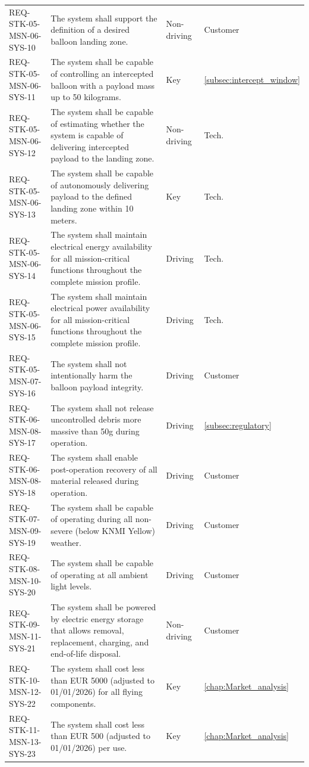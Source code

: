 \begin{xltabular}{\textwidth}{p{0.16\textwidth} p{0.5\textwidth} X p{0.1\textwidth}}
REQ-STK-05-MSN-06-SYS-10 & The system shall support the definition of a desired balloon landing zone. & Non-driving &  Customer\\ 
REQ-STK-05-MSN-06-SYS-11 & The system shall be capable of controlling an intercepted balloon with a payload mass up to 50 kilograms. & Key &  \ref{subsec:intercept_window}\\ 
REQ-STK-05-MSN-06-SYS-12 & The system shall be capable of estimating whether the system is capable of delivering intercepted payload to the landing zone. & Non-driving &  Tech.\\ 
REQ-STK-05-MSN-06-SYS-13 & The system shall be capable of autonomously delivering payload to the defined landing zone within 10 meters. & Key &  Tech.\\ 
REQ-STK-05-MSN-06-SYS-14 & The system shall maintain electrical energy availability for all mission-critical functions throughout the complete mission profile. & Driving &  Tech.\\ 
REQ-STK-05-MSN-06-SYS-15 & The system shall maintain electrical power availability for all mission-critical functions throughout the complete mission profile. & Driving &  Tech.\\ 
REQ-STK-05-MSN-07-SYS-16 & The system shall not intentionally harm the balloon payload integrity. & Driving &  Customer\\ 
REQ-STK-06-MSN-08-SYS-17 & The system shall not release uncontrolled debris more massive than 50g during operation. & Driving &  \ref{subsec:regulatory}\\ 
REQ-STK-06-MSN-08-SYS-18 & The system shall enable post-operation recovery of all material released during operation. & Driving &  Customer\\ 
REQ-STK-07-MSN-09-SYS-19 & The system shall be capable of operating during all non-severe (below KNMI Yellow) weather. & Driving &  Customer\\ 
REQ-STK-08-MSN-10-SYS-20 & The system shall be capable of operating at all ambient light levels. & Driving &  Customer\\ 
REQ-STK-09-MSN-11-SYS-21 & The system shall be powered by electric energy storage that allows removal, replacement, charging, and end-of-life disposal. & Non-driving &  Customer\\ 
REQ-STK-10-MSN-12-SYS-22 & The system shall cost less than EUR 5000 (adjusted to 01/01/2026) for all flying components. & Key &  \ref{chap:Market_analysis}\\ 
REQ-STK-11-MSN-13-SYS-23 & The system shall cost less than EUR 500 (adjusted to 01/01/2026) per use. & Key &  \ref{chap:Market_analysis}\\ 

\end{xltabular}
